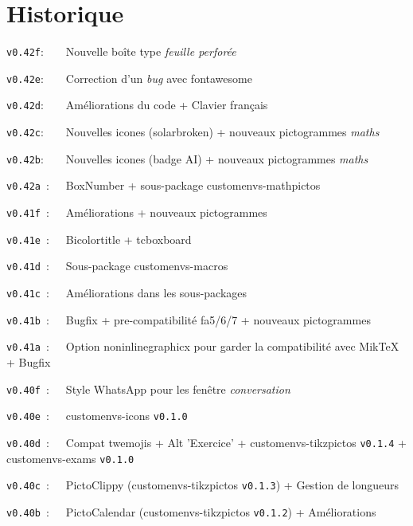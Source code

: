 \documentclass[french,11pt,a4paper]{article}
\begin{document}

\hypertarget{matoc}{}

\tableofcontents

\vspace*{5mm}

\pagebreak

\section{Historique}

\verb|v0.42f|:~~~~Nouvelle boîte type \textit{feuille perforée}

\verb|v0.42e|:~~~~Correction d'un \textit{bug} avec \textsf{fontawesome}

\verb|v0.42d|:~~~~Améliorations du code + Clavier français

\verb|v0.42c|:~~~~Nouvelles icones (\textsf{solarbroken}) + nouveaux pictogrammes \textit{maths}

\verb|v0.42b|:~~~~Nouvelles icones (\textsf{badge AI}) + nouveaux pictogrammes \textit{maths}

\verb|v0.42a|~:~~~BoxNumber + sous-package \textsf{customenvs-mathpictos}

\verb|v0.41f|~:~~~Améliorations + nouveaux pictogrammes

\verb|v0.41e|~:~~~Bicolortitle + tcboxboard

\verb|v0.41d|~:~~~Sous-package \textsf{customenvs-macros}

\verb|v0.41c|~:~~~Améliorations dans les sous-packages

\verb|v0.41b|~:~~~Bugfix + pre-compatibilité \textsf{fa5/6/7} + nouveaux pictogrammes

\verb|v0.41a|~:~~~Option \textsf{noninlinegraphicx} pour garder la compatibilité avec \textsf{MikTeX} + Bugfix

\verb|v0.40f|~:~~~Style \textsf{WhatsApp} pour les fenêtre \textit{conversation}

\verb|v0.40e|~:~~~\textsf{customenvs-icons} \texttt{v0.1.0}

\verb|v0.40d|~:~~~Compat \textsf{twemojis} + \textsf{Alt} 'Exercice' + \textsf{customenvs-tikzpictos} \texttt{v0.1.4} + \textsf{customenvs-exams} \texttt{v0.1.0}

\verb|v0.40c|~:~~~PictoClippy (\textsf{customenvs-tikzpictos} \texttt{v0.1.3}) + Gestion de longueurs

\verb|v0.40b|~:~~~PictoCalendar (\textsf{customenvs-tikzpictos} \texttt{v0.1.2}) + Améliorations
\end{document}
